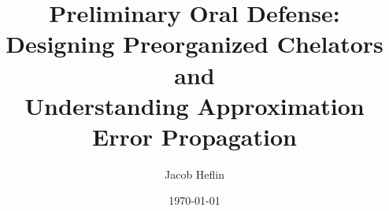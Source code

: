 \documentclass{beamer}
\title{Preliminary Oral Defense:\\Designing Preorganized Chelators and\\Understanding Approximation
Error Propagation}
\author{Jacob Heflin}
\date{\today}
\begin{document}
\frame{\titlepage}



\end{document}
